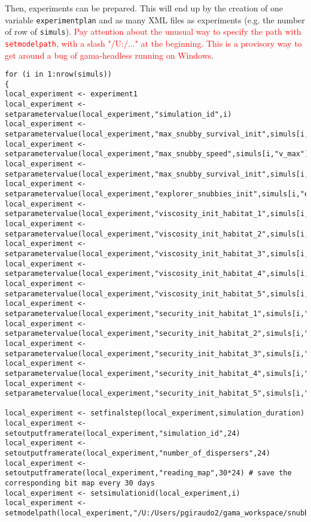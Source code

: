 Then, experiments can be prepared. This will end up by the creation of one variable \texttt{experimentplan} and as many XML files as experiments (e.g. the number of row of \texttt{simuls}). \textcolor{red}{Pay attention about the unusual way to specify the path with \texttt{setmodelpath}, with a slash "/U:/..." at the beginning. This is a provisory way to get around a bug of gama-headless running on Windows}.

\begin{lstlisting}
for (i in 1:nrow(simuls))
{
local_experiment <- experiment1
local_experiment <- setparametervalue(local_experiment,"simulation_id",i)
local_experiment <-  setparametervalue(local_experiment,"max_snubby_survival_init",simuls[i,"s_max"])
local_experiment <-  setparametervalue(local_experiment,"max_snubby_speed",simuls[i,"v_max"])
local_experiment <-  setparametervalue(local_experiment,"max_snubby_survival_init",simuls[i,"s_max"])
local_experiment <-  setparametervalue(local_experiment,"explorer_snubbies_init",simuls[i,"explorer_snubbies"])
local_experiment <-  setparametervalue(local_experiment,"viscosity_init_habitat_1",simuls[i,"viscosity_factor_habitat_1"])
local_experiment <-  setparametervalue(local_experiment,"viscosity_init_habitat_2",simuls[i,"viscosity_factor_habitat_2"])
local_experiment <-  setparametervalue(local_experiment,"viscosity_init_habitat_3",simuls[i,"viscosity_factor_habitat_3"])
local_experiment <-  setparametervalue(local_experiment,"viscosity_init_habitat_4",simuls[i,"viscosity_factor_habitat_4"])
local_experiment <-  setparametervalue(local_experiment,"viscosity_init_habitat_5",simuls[i,"viscosity_factor_habitat_5"])
local_experiment <-  setparametervalue(local_experiment,"security_init_habitat_1",simuls[i,"security_factor_habitat_1"])
local_experiment <-  setparametervalue(local_experiment,"security_init_habitat_2",simuls[i,"security_factor_habitat_2"])
local_experiment <-  setparametervalue(local_experiment,"security_init_habitat_3",simuls[i,"security_factor_habitat_3"])
local_experiment <-  setparametervalue(local_experiment,"security_init_habitat_4",simuls[i,"security_factor_habitat_4"])
local_experiment <-  setparametervalue(local_experiment,"security_init_habitat_5",simuls[i,"security_factor_habitat_5"])

local_experiment <- setfinalstep(local_experiment,simulation_duration)
local_experiment <- setoutputframerate(local_experiment,"simulation_id",24)
local_experiment <- setoutputframerate(local_experiment,"number_of_dispersers",24)
local_experiment <- setoutputframerate(local_experiment,"reading_map",30*24) # save the corresponding bit map every 30 days
local_experiment <- setsimulationid(local_experiment,i)
local_experiment <- setmodelpath(local_experiment,"/U:/Users/pgiraudo2/gama_workspace/snubbies/models/snubbies.gaml")


\end{lstlisting}

